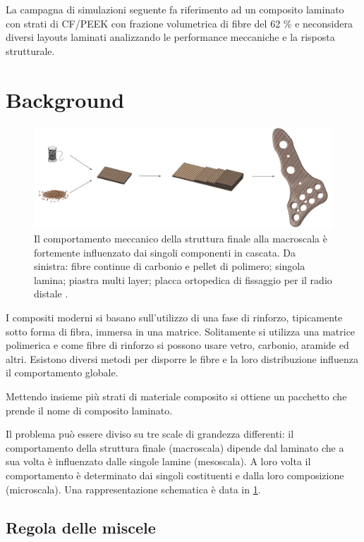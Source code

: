 \documentclass[a4paper,num-refs]{oup-contemporary}
\begin{document}
La campagna di simulazioni seguente fa riferimento ad un composito laminato con strati di CF/PEEK con frazione volumetrica di fibre del 62 \% e neconsidera diversi layouts laminati analizzando le performance meccaniche e la risposta strutturale.  



\section{Background}

\begin{figure}[bt!]
	\includegraphics[width=\textwidth]{laminate_figures.pdf}
	\caption{Il comportamento meccanico della struttura finale alla macroscala è fortemente influenzato dai singoli componenti in cascata. Da sinistra: fibre continue di carbonio e pellet di polimero; singola lamina; piastra multi layer; placca ortopedica di fissaggio per il radio distale \citep{MUGNAI2018877}.}
\label{fig:laminates_general}
\end{figure}

I compositi moderni si basano sull'utilizzo di una fase di rinforzo, tipicamente sotto forma di fibra, immersa in una matrice. Solitamente si utilizza una matrice polimerica e come fibre di rinforzo si possono usare vetro, carbonio, aramide ed altri. Esistono diversi metodi per disporre le fibre e la loro distribuzione influenza il comportamento globale. 

Mettendo insieme più strati di materiale composito si ottiene un pacchetto che prende il nome di composito laminato.

Il problema può essere diviso su tre scale di grandezza differenti: il comportamento della struttura finale (macroscala) dipende dal laminato che a sua volta è influenzato dalle singole lamine (mesoscala). A loro volta il comportamento è determinato dai singoli costituenti e dalla loro composizione (microscala). Una rappresentazione schematica è data in \cref{fig:laminates_general}.


\subsection{Regola delle miscele}
\end{document}
